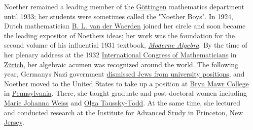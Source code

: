 Noether remained a leading member of the \href{https://en.wikipedia.org/wiki/Göttingen}{Göttingen} mathematics department until 1933; her students were sometimes called the "Noether Boys". In 1924, Dutch mathematician \href{https://en.wikipedia.org/wiki/B._L._van_der_Waerden}{B. L. van der Waerden} joined her circle and soon became the leading expositor of Noether\textquotesingle s ideas; her work was the foundation for the second volume of his influential 1931 textbook, \emph{\href{https://en.wikipedia.org/wiki/Moderne_Algebra}{Moderne Algebra}}. By the time of her plenary address at the 1932 \href{https://en.wikipedia.org/wiki/International_Congress_of_Mathematicians}{International Congress of Mathematicians} in \href{https://en.wikipedia.org/wiki/Zürich}{Zürich}, her algebraic acumen was recognized around the world. The following year, Germany\textquotesingle s Nazi government \href{https://en.wikipedia.org/wiki/Anti-Jewish_legislation_in_pre-war_Nazi_Germany}{dismissed Jews from university positions}, and Noether moved to the United States to take up a position at \href{https://en.wikipedia.org/wiki/Bryn_Mawr_College}{Bryn Mawr College} in \href{https://en.wikipedia.org/wiki/Pennsylvania}{Pennsylvania}. There, she taught graduate and post-doctoral women including \href{https://en.wikipedia.org/wiki/Marie_Johanna_Weiss}{Marie Johanna Weiss} and \href{https://en.wikipedia.org/wiki/Olga_Taussky-Todd}{Olga Taussky-Todd}. At the same time, she lectured and conducted research at the \href{https://en.wikipedia.org/wiki/Institute_for_Advanced_Study}{Institute for Advanced Study} in \href{https://en.wikipedia.org/wiki/Princeton,_New_Jersey}{Princeton, New Jersey}.

